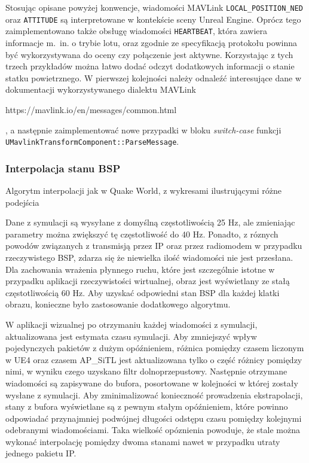 Stosując opisane powyżej konwencje, wiadomości MAVLink \texttt{LOCAL\_POSITION\_NED} oraz \texttt{ATTITUDE} są interpretowane w kontekście sceny Unreal Engine. Oprócz tego zaimplementowano także obsługę wiadomości \texttt{HEARTBEAT}, która zawiera informacje m.~in. o trybie lotu, oraz zgodnie ze specyfikacją protokołu powinna być wykorzystywana do oceny czy połączenie jest aktywne. Korzystając z tych trzech przykładów można łatwo dodać odczyt dodatkowych informacji o stanie statku powietrznego. W pierwszej kolejności należy odnaleźć interesujące dane w dokumentacji wykorzystywanego dialektu MAVLink \begin{todo}https://mavlink.io/en/messages/common.html\end{todo}, a następnie zaimplementować nowe przypadki w bloku \emph{switch-case} funkcji \texttt{UMavlinkTransformComponent::ParseMessage}.

\subsubsection{Interpolacja stanu BSP}
\begin{todo}
    Algorytm interpolacji jak w Quake World, z wykresami ilustrującymi różne podejścia
\end{todo}
Dane z symulacji są wysyłane z domyślną częstotliwością 25 Hz, ale zmieniając parametry można zwiększyć tę częstotliwość do 40 Hz. Ponadto, z róznych powodów związanych z transmisją przez IP oraz przez radiomodem w przypadku rzeczywistego BSP, zdarza się że niewielka ilość wiadomości nie jest przesłana. Dla zachowania wrażenia płynnego ruchu, które jest szczególnie istotne w przypadku aplikacji rzeczywistości wirtualnej, obraz jest wyświetlany ze stałą częstotliwością 60 Hz. Aby uzyskać odpowiedni stan BSP dla każdej klatki obrazu, konieczne było zastosowanie dodatkowego algorytmu.

W aplikacji wizualnej po otrzymaniu każdej wiadomości z symulacji, aktualizowana jest estymata czasu symulacji. Aby zmniejszyć wpływ pojedynczych pakietów z dużym opóźnieniem, różnica pomiędzy czasem liczonym w UE4 oraz czasem AP\_SiTL jest aktualizowana tylko o część różnicy pomiędzy nimi, w wyniku czego uzyskano filtr dolnoprzepustowy. Następnie otrzymane wiadomości są zapisywane do bufora, posortowane w kolejności w której zostały wysłane z symulacji. Aby zminimalizować konieczność prowadzenia ekstrapolacji, stany z bufora wyświetlane są z pewnym stałym opóźnieniem, które powinno odpowiadać przynajmniej podwójnej długości odstępu czasu pomiędzy kolejnymi odebranymi wiadomościami. Taka wielkość opóznienia powoduje, że stale można wykonać interpolację pomiędzy dwoma stanami nawet w przypadku utraty jednego pakietu IP.

